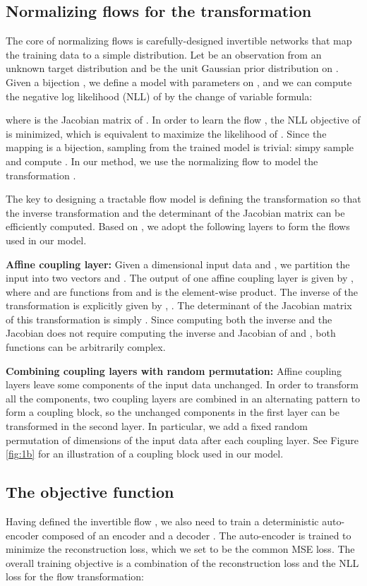 \documentclass{article}
\begin{document}
\subsection{Normalizing flows for the transformation \texorpdfstring{}{F}}
 The core of normalizing flows is carefully-designed invertible networks that map the training data to a simple distribution. Let  be an observation from an unknown target distribution  and  be the unit Gaussian prior distribution on . Given a bijection , we define a model  with parameters  on , and we can compute the negative log likelihood (NLL) of  by the change of variable formula: 
 
where  is the Jacobian matrix of . In order to learn the flow , the NLL objective of  is minimized, which is equivalent to maximize the likelihood of . Since the mapping is a bijection, sampling from the trained model  is trivial: simpy sample  and compute . In our method, we use the normalizing flow to model the transformation .

The key to designing a tractable flow model is defining the transformation  so that the inverse transformation and the determinant of the Jacobian matrix can be efficiently computed. Based on \citep{REAL}, we adopt the following layers to form the flows used in our model.

{\bf Affine coupling layer:}
Given a  dimensional input data  and , we partition the input into two vectors  and . The output of one affine coupling layer is given by
,  where  and  are functions from  and  is the element-wise product. The inverse of the transformation is explicitly given by
, . The determinant of the Jacobian matrix of this transformation is simply  . Since computing both the inverse and the Jacobian does not require computing the inverse and Jacobian of  and , both functions can be arbitrarily complex. 

{\bf Combining coupling layers with random permutation:}
Affine coupling layers leave some components of the input data unchanged. In order to transform all the components, two coupling layers are combined in an alternating pattern to form a coupling block, so the unchanged components in the first layer can be transformed in the second layer. In particular, we add a fixed random permutation of dimensions of the input data after each coupling layer. See Figure \ref{fig:1b} for an illustration of a coupling block used in our model. 

 \subsection{The objective function} \label{objective}
 Having defined the invertible flow , we also need to train a deterministic auto-encoder composed of an encoder  and a decoder . The auto-encoder is trained to minimize the reconstruction loss, which we set to be the common MSE loss. The overall training objective is a combination of the reconstruction loss and the NLL loss for the flow transformation:
\end{document}

